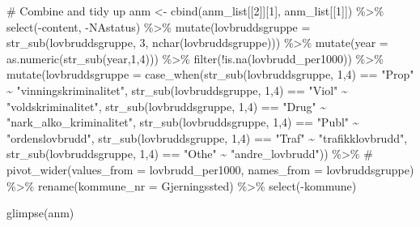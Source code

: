 \documentclass[
  norsk,
  letterpaper,
  DIV=11,
  numbers=noendperiod]{scrreprt}
\newenvironment{Shaded}{\begin{snugshade}}{\end{snugshade}}
\newcommand{\AttributeTok}[1]{\textcolor[rgb]{0.40,0.45,0.13}{#1}}
\newcommand{\CommentTok}[1]{\textcolor[rgb]{0.37,0.37,0.37}{#1}}
\newcommand{\DecValTok}[1]{\textcolor[rgb]{0.68,0.00,0.00}{#1}}
\newcommand{\FunctionTok}[1]{\textcolor[rgb]{0.28,0.35,0.67}{#1}}
\newcommand{\NormalTok}[1]{\textcolor[rgb]{0.00,0.23,0.31}{#1}}
\newcommand{\OtherTok}[1]{\textcolor[rgb]{0.00,0.23,0.31}{#1}}
\newcommand{\SpecialCharTok}[1]{\textcolor[rgb]{0.37,0.37,0.37}{#1}}
\newcommand{\StringTok}[1]{\textcolor[rgb]{0.13,0.47,0.30}{#1}}
\theoremstyle{definition}
\theoremstyle{remark}
\begin{document}
\begin{Shaded}
\begin{Highlighting}[]
\CommentTok{\# Combine and tidy up}
\NormalTok{anm }\OtherTok{\textless{}{-}} \FunctionTok{cbind}\NormalTok{(anm\_list[[}\DecValTok{2}\NormalTok{]][}\DecValTok{1}\NormalTok{], anm\_list[[}\DecValTok{1}\NormalTok{]]) }\SpecialCharTok{\%\textgreater{}\%}
  \FunctionTok{select}\NormalTok{(}\SpecialCharTok{{-}}\NormalTok{content, }\SpecialCharTok{{-}}\NormalTok{NAstatus) }\SpecialCharTok{\%\textgreater{}\%}
  \FunctionTok{mutate}\NormalTok{(}\AttributeTok{lovbruddsgruppe =} \FunctionTok{str\_sub}\NormalTok{(lovbruddsgruppe, }\DecValTok{3}\NormalTok{, }\FunctionTok{nchar}\NormalTok{(lovbruddsgruppe))) }\SpecialCharTok{\%\textgreater{}\%} 
  \FunctionTok{mutate}\NormalTok{(}\AttributeTok{year =} \FunctionTok{as.numeric}\NormalTok{(}\FunctionTok{str\_sub}\NormalTok{(year,}\DecValTok{1}\NormalTok{,}\DecValTok{4}\NormalTok{))) }\SpecialCharTok{\%\textgreater{}\%} 
  \FunctionTok{filter}\NormalTok{(}\SpecialCharTok{!}\FunctionTok{is.na}\NormalTok{(lovbrudd\_per1000)) }\SpecialCharTok{\%\textgreater{}\%} 
  \FunctionTok{mutate}\NormalTok{(}\AttributeTok{lovbruddsgruppe =} \FunctionTok{case\_when}\NormalTok{(}\FunctionTok{str\_sub}\NormalTok{(lovbruddsgruppe, }\DecValTok{1}\NormalTok{,}\DecValTok{4}\NormalTok{) }\SpecialCharTok{==} \StringTok{"Prop"} \SpecialCharTok{\textasciitilde{}} \StringTok{"vinningskriminalitet"}\NormalTok{, }
                                     \FunctionTok{str\_sub}\NormalTok{(lovbruddsgruppe, }\DecValTok{1}\NormalTok{,}\DecValTok{4}\NormalTok{) }\SpecialCharTok{==} \StringTok{"Viol"} \SpecialCharTok{\textasciitilde{}} \StringTok{"voldskriminalitet"}\NormalTok{,}
                                     \FunctionTok{str\_sub}\NormalTok{(lovbruddsgruppe, }\DecValTok{1}\NormalTok{,}\DecValTok{4}\NormalTok{) }\SpecialCharTok{==} \StringTok{"Drug"} \SpecialCharTok{\textasciitilde{}} \StringTok{"nark\_alko\_kriminalitet"}\NormalTok{,}
                                     \FunctionTok{str\_sub}\NormalTok{(lovbruddsgruppe, }\DecValTok{1}\NormalTok{,}\DecValTok{4}\NormalTok{) }\SpecialCharTok{==} \StringTok{"Publ"} \SpecialCharTok{\textasciitilde{}} \StringTok{"ordenslovbrudd"}\NormalTok{,}
                                     \FunctionTok{str\_sub}\NormalTok{(lovbruddsgruppe, }\DecValTok{1}\NormalTok{,}\DecValTok{4}\NormalTok{) }\SpecialCharTok{==} \StringTok{"Traf"} \SpecialCharTok{\textasciitilde{}} \StringTok{"trafikklovbrudd"}\NormalTok{,}
                                     \FunctionTok{str\_sub}\NormalTok{(lovbruddsgruppe, }\DecValTok{1}\NormalTok{,}\DecValTok{4}\NormalTok{) }\SpecialCharTok{==} \StringTok{"Othe"} \SpecialCharTok{\textasciitilde{}} \StringTok{"andre\_lovbrudd"}\NormalTok{)) }\SpecialCharTok{\%\textgreater{}\%} 
  \CommentTok{\# pivot\_wider(values\_from = lovbrudd\_per1000, names\_from = lovbruddsgruppe) \%\textgreater{}\% }
  \FunctionTok{rename}\NormalTok{(}\AttributeTok{kommune\_nr =}\NormalTok{ Gjerningssted) }\SpecialCharTok{\%\textgreater{}\%} 
  \FunctionTok{select}\NormalTok{(}\SpecialCharTok{{-}}\NormalTok{kommune)}

\FunctionTok{glimpse}\NormalTok{(anm)}
\end{Highlighting}
\end{Shaded}
\end{document}
